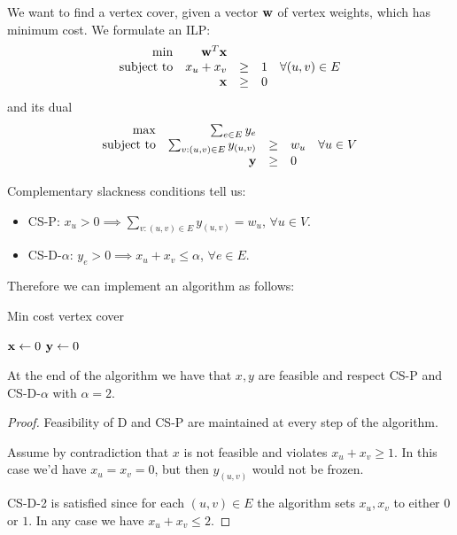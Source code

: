 \documentclass[12pt]{extarticle}
\renewcommand{\vec}[1]{\bvec{#1}}
\begin{document}
We want to find a vertex cover, given a vector $\vec w$ of vertex weights, which has minimum cost.
We formulate an ILP:
\begin{equation}
	\begin{array}{rrcll}
		\min              & \vec w^T \vec x &      &   &                      \\
		\text{subject to} & x_u + x_v       & \geq & 1 & \forall (u, v) \in E \\
		                  & \vec x          & \geq & 0 &
	\end{array}
\end{equation}
and its dual
\begin{equation}
	\begin{array}{rrcll}
		\max              & \sum_{e \in E} y_e                &      &     &                 \\
		\text{subject to} & \sum_{v: (u, v) \in E} y_{(u, v)} & \geq & w_u & \forall u \in V \\
		                  & \vec y                            & \geq & 0   &
	\end{array}
\end{equation}

Complementary slackness conditions tell us:
\begin{itemize}
	\item CS-P: $x_u > 0 \implies \sum_{v: (u, v) \in E} y_{(u, v)} = w_u$, $\forall u \in V$.
	\item CS-D-$\alpha$: $y_e > 0 \implies x_u + x_v \leq \alpha$, $\forall e \in E$.
\end{itemize}

Therefore we can implement an algorithm as follows:
\begin{algorithm}
	\caption{Min cost vertex cover}
	$\vec x \gets 0$ 
	$\vec y \gets 0$ 

\end{algorithm}

At the end of the algorithm we have that $x, y$ are feasible and respect CS-P and CS-D-$\alpha$ with
$\alpha = 2$.

\begin{proof}
	Feasibility of D and CS-P are maintained at every step of the algorithm.

	Assume by contradiction that $x$ is not feasible and violates $x_u + x_v \geq 1$. In this case
	we'd have $x_u = x_v = 0$, but then $y_{(u, v)}$ would not be frozen.

	CS-D-2 is satisfied since for each $(u, v) \in E$ the algorithm sets $x_u, x_v$ to either $0$ or
	$1$. In any case we have $x_u + x_v \leq 2$.
\end{proof}
\end{document}
